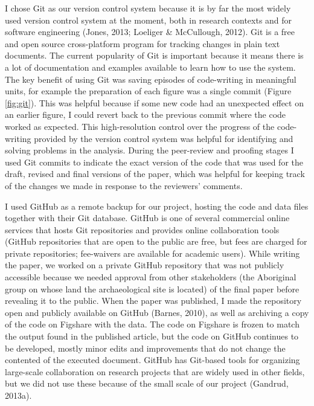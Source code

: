 \documentclass[american,man]{apa6}
\begin{document}
I chose Git as our version control system because it is by far the most
widely used version control system at the moment, both in research
contexts and for software engineering (Jones, 2013; Loeliger \&
{McCullough}, 2012). Git is a free and open source cross-platform
program for tracking changes in plain text documents. The current
popularity of Git is important because it means there is a lot of
documentation and examples available to learn how to use the system. The
key benefit of using Git was saving episodes of code-writing in
meaningful units, for example the preparation of each figure was a
single commit (Figure \ref{fig:git}). This was helpful because if some
new code had an unexpected effect on an earlier figure, I could revert
back to the previous commit where the code worked as expected. This
high-resolution control over the progress of the code-writing provided
by the version control system was helpful for identifying and solving
problems in the analysis. During the peer-review and proofing stages I
used Git commits to indicate the exact version of the code that was used
for the draft, revised and final versions of the paper, which was
helpful for keeping track of the changes we made in response to the
reviewers' comments.

I used GitHub as a remote backup for our project, hosting the code and
data files together with their Git database. GitHub is one of several
commercial online services that hosts Git repositories and provides
online collaboration tools (GitHub repositories that are open to the
public are free, but fees are charged for private repositories;
fee-waivers are available for academic users). While writing the paper,
we worked on a private GitHub repository that was not publicly
accessible because we needed approval from other stakeholders (the
Aboriginal group on whose land the archaeological site is located) of
the final paper before revealing it to the public. When the paper was
published, I made the repository open and publicly available on GitHub
(Barnes, 2010), as well as archiving a copy of the code on Figshare with
the data. The code on Figshare is frozen to match the output found in
the published article, but the code on GitHub continues to be developed,
mostly minor edits and improvements that do not change the contented of
the executed document. GitHub has Git-based tools for organizing
large-scale collaboration on research projects that are widely used in
other fields, but we did not use these because of the small scale of our
project (Gandrud, 2013a).
\end{document}
